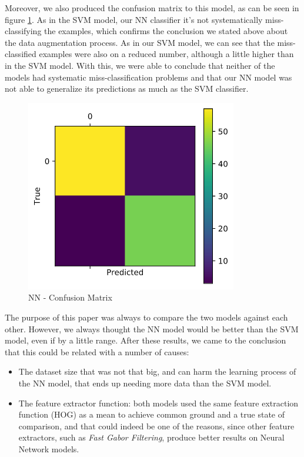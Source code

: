 Moreover, we also produced the confusion matrix to this model, as can be seen in figure \ref{fig:nn-confusion-matrix}. As in the SVM model, our NN classifier it's not systematically miss-classifying the examples, which confirms the conclusion we stated above about the data augmentation process. As in our SVM model, we can see that the miss-classified examples were also on a reduced number, although a little higher than in the SVM model. With this, we were able to conclude that neither of the models had systematic miss-classification problems and that our NN model was not able to generalize its predictions as much as the SVM classifier.

\begin{figure}[htbp]
\centerline{\includegraphics[width=0.65\linewidth]{images/nn_conf_matrix.png}}
\caption{NN - Confusion Matrix}
\label{fig:nn-confusion-matrix}
\end{figure}

The purpose of this paper was always to compare the two models against each other. However, we always thought the NN model would be better than the SVM model, even if by a little range. After these results, we came to the conclusion that this could be related with a number of causes:

\begin{itemize} 
\item The dataset size that was not that big, and can harm the learning process of the NN model, that ends up needing more data than the SVM model.
\item The feature extractor function: both models used the same feature extraction function (HOG) as a mean to achieve common ground and a true state of comparison, and that could indeed be one of the reasons, since other feature extractors, such as \textit{Fast Gabor Filtering}, produce better results on Neural Network models.
\end{itemize}

